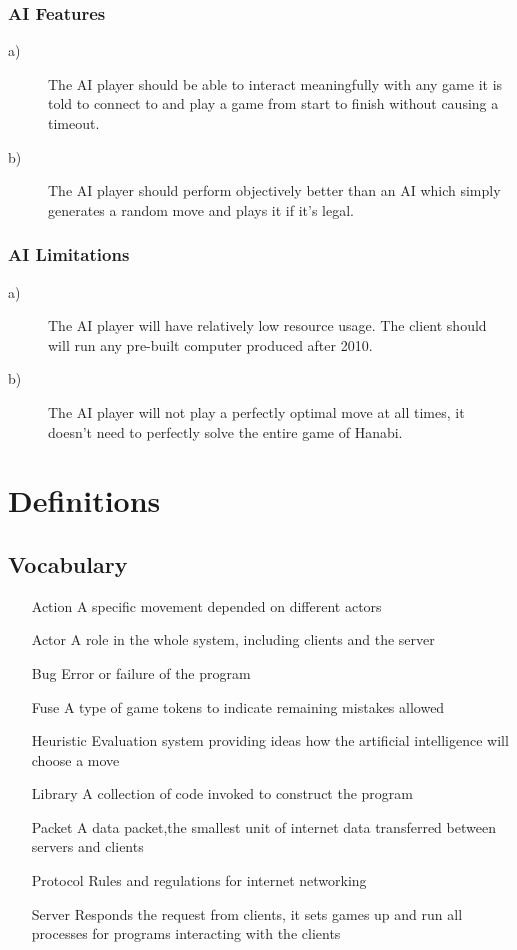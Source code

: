 \documentclass[12pt]{article}
\begin{document}
\subsubsection{AI Features}
\begin{description}
\item[a)]The AI player should be able to interact meaningfully with any game it is told to
connect to and play a game from start to finish without causing a timeout.

\item[b)]The AI player should perform objectively better than an AI which simply generates
a random move and plays it if it's legal.

\end{description}

\subsubsection{AI Limitations}
\begin{description}
\item[a)]The AI player will have relatively low resource usage. The client should will
run any pre-built computer produced after 2010.

\item[b)]The AI player will not play a perfectly optimal move at all times, it
doesn't need to perfectly solve the entire game of Hanabi.

\end{description}


\section{Definitions}
\subsection{Vocabulary}
\begin{itemize}
\item[Action] A specific movement depended on different actors
\item[Actor] A role in the whole system, including clients and the server
\item[Bug] Error or failure of the program 
\item[Fuse] A type of game tokens to indicate remaining mistakes allowed
\item[Heuristic] Evaluation system providing ideas how the artificial intelligence will choose a move
\item[Library] A collection of code invoked to construct the program
\item[Packet] A data packet,the smallest unit of internet data transferred between servers and clients
\item[Protocol] Rules and regulations for internet networking
\item[Server] Responds the request from clients, it sets games up and run all processes for programs interacting with the clients
\end{itemize}
\end{document}
